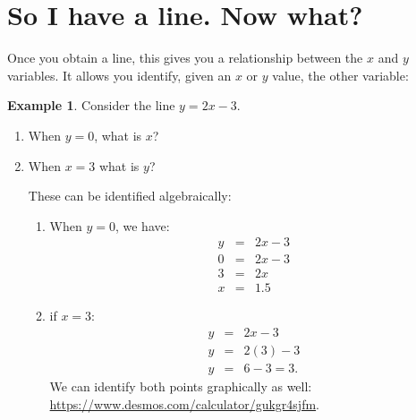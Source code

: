\documentclass[10pt]{article}
\theoremstyle{definition}
\newtheorem{example}[equation]{Example}
\begin{document}
\section{So I have a line.  Now what?}

Once you obtain a line, this gives you a relationship between the $x$ and $y$ variables.  It allows you identify, given an $x$ or $y$ value, the other variable:

\begin{example}
Consider the line $y=2x-3$.
\begin{enumerate}
\item When $y=0$, what is $x$?
\item When $x=3$ what is $y$?

These can be identified algebraically:
\begin{enumerate}
\item When $y=0$, we have:
\begin{eqnarray*}
y&=&2x-3\\
0&=&2x-3\\
3&=&2x\\
x&=&1.5
\end{eqnarray*}
\item if $x=3$:
\begin{eqnarray*}
y&=&2x-3\\
y&=&2(3)-3\\
y&=&6-3=3.
\end{eqnarray*}
We can identify both points graphically as well: \url{https://www.desmos.com/calculator/gukgr4sjfm}.
\end{enumerate}


\end{enumerate}

\end{example}
\end{document}

